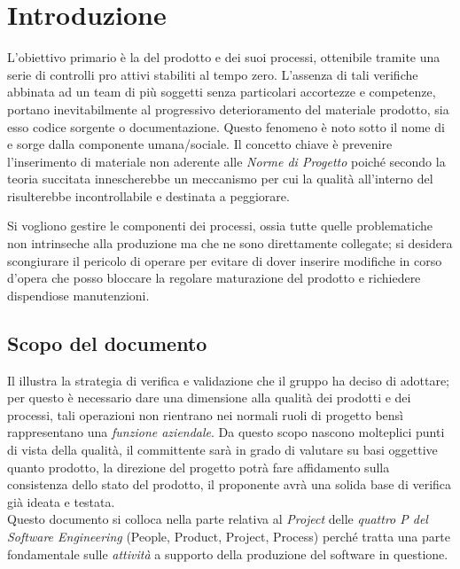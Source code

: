 \section{Introduzione}
 L'obiettivo primario è la  del prodotto e dei suoi processi, ottenibile tramite una serie di controlli pro attivi stabiliti al tempo zero. L'assenza di tali verifiche abbinata ad un team di più soggetti senza particolari accortezze e competenze, portano inevitabilmente al progressivo deterioramento del materiale prodotto, sia esso codice sorgente o documentazione. Questo fenomeno è noto sotto il nome di  e sorge dalla componente umana/sociale. Il concetto chiave è prevenire l'inserimento di materiale non aderente alle \emph{Norme di Progetto} poiché secondo la teoria succitata innescherebbe un meccanismo per cui la qualità all'interno del  risulterebbe incontrollabile e destinata a peggiorare.


Si vogliono gestire le componenti  dei processi, ossia tutte quelle problematiche non intrinseche alla produzione ma che ne sono direttamente collegate; si desidera scongiurare il pericolo di operare  per evitare di dover inserire modifiche in corso d'opera che posso bloccare la regolare maturazione del prodotto e richiedere dispendiose manutenzioni.

\subsection{Scopo del documento}
Il \DocTitle  illustra la strategia di verifica e validazione che il gruppo \GroupName{} ha deciso di adottare; per questo è necessario dare una dimensione alla qualità dei prodotti e dei processi, tali operazioni non rientrano nei normali ruoli di progetto bensì rappresentano una \emph{funzione aziendale}. Da questo scopo nascono molteplici punti di vista della qualità, il committente sarà in grado di valutare su basi oggettive quanto prodotto, la direzione del progetto potrà fare affidamento sulla consistenza dello stato del prodotto, il proponente avrà una solida base di verifica già ideata e testata. \\ Questo documento si colloca nella parte relativa al \emph{Project} delle \emph{quattro P del Software Engineering} (People, Product, Project, Process) perché tratta una parte fondamentale sulle \emph{attività} a supporto della produzione del software in questione.

